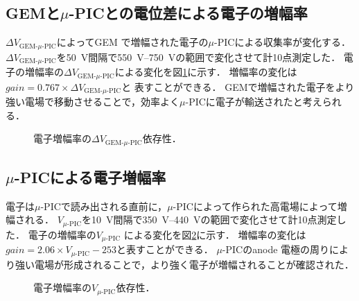 \documentclass[../master]{subfiles}
\begin{document}

\subsection{GEMと$\mu$-PICとの電位差による電子の増幅率}
$\Delta V_{\text{GEM-}\mu\text{-PIC}}$によってGEM で増幅された電子の$\mu$-PICによる収集率が変化する．
$\Delta V_{\text{GEM-}\mu\text{-PIC}}$を\SI{50}{\volt}間隔で\SIrange{550}{750}{\volt}の範囲で変化させて計10点測定した．
電子の増幅率の$\Delta V_{\text{GEM-}\mu\text{-PIC}}$による変化を図\ref{fig::gain_GEM_uPIC_V_dep}に示す．
増幅率の変化は$\mathit{gain} = 0.767\times{\Delta V_{\text{GEM-}\mu\text{-PIC}}}$と
表すことができる．
GEMで増幅された電子をより強い電場で移動させることで，効率よく$\mu$-PICに電子が輸送されたと考えられる．
\begin{figure}
  \centering
  \scalebox{0.7}{}
  \caption{電子増幅率の$\Delta V_{\text{GEM-}\mu\text{-PIC}}$依存性．}
  \label{fig::gain_GEM_uPIC_V_dep}
\end{figure}

\subsection{$\mu$-PICによる電子増幅率}
電子は$\mu$-PICで読み出される直前に，$\mu$-PICによって作られた高電場によって増幅される．
$V_{\mu\text{-PIC}}$を\SI{10}{\volt}間隔で\SIrange{350}{440}{\volt}の範囲で変化させて計10点測定した．
電子の増幅率の$V_{\mu\text{-PIC}}$ による変化を図\ref{fig::gain_uPIC_V_dep}に示す．
増幅率の変化は$\mathit{gain} = 2.06\times{V_{\mu\text{-PIC}}}-253$と表すことができる．
$\mu$-PICのanode 電極の周りにより強い電場が形成されることで，より強く電子が増幅されることが確認された．
\begin{figure}
  \centering
  \scalebox{0.7}{}
  \caption{電子増幅率の$V_{\mu\text{-PIC}}$依存性．}
  \label{fig::gain_uPIC_V_dep}
\end{figure}
\end{document}
